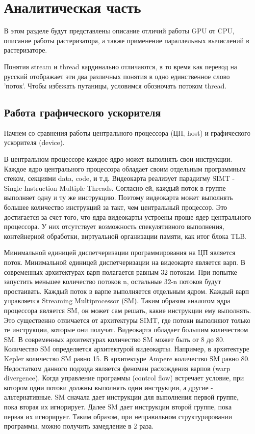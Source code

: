\chapter{Аналитическая часть}
В этом разделе будут представлены описание отличий работы GPU от CPU, описание работы растеризатора, а также применение параллельных вычислений в растеризаторе.

Понятия stream и thread кардинально отличаются, в то время как перевод на русский отображает эти два различных понятия в одно единственное слово 'поток'. Чтобы избежать путаницы, условимся обозночать потоком thread.

\section{Работа графического ускорителя}

Начнем со сравнения работы центрального процессора (ЦП, host) и графического ускорителя (device).

В центральном процессоре каждое ядро может выполнять свои инструкции. Каждое ядро центрального процессора обладает своим отдельным программным стеком, секциями data, code, и т.д. Видеокарта реализует парадигму SIMT - Single Instruction Multiple Threads. 
Согласно ей, каждый поток в группе выполняет одну и ту же инструкцию. Поэтому видеокарта может выполнять большее количество инструкций за такт, чем центральный процессор.
Это достигается за счет того, что ядра видеокарты устроены проще ядер центрального процессора. У них отсутствует возможность спекулятивного выполнения, контейнерной обработки, виртуальной организации памяти, как итог блока TLB.

Минимальной единицей диспетчеризации программирования на ЦП является поток. Минимальной единицей диспетчеризации на видеокарте является варп. В современных архитектурах варп полагается равным 32 потокам. При попытке запустить меньшее количество потоков n, остальные 32-n потоков будут простаивать.
Каждый поток в варпе выполняется отдельным ядром. Каждый варп управляется Streaming Multiprocessor (SM). Таким образом аналогом ядра процессора является SM, он может сам решать, какие инструкции ему выполнять. Это существенно отличается от архитектуры SIMT, где потоки выполняют только те инструкции, которые они получат. Видеокарта обладает большим количеством SM. В современных архитектурах количество SM может быть от 8 до 80. Количество SM определяется архитектурой видеокарты. Например, в архитектуре Kepler количество SM равно 15. В архитектуре Ampere количество SM равно 80.
Недостатком данного подхода является феномен расхождения варпов (warp divergence). Когда управление программы (control flow) встречает условие, при котором одни потоки должны выполнять одни инструкции, а другие - альтернативные. SM сначала дает инструкции для выполнения первой группе, пока вторая их игнорирует. Далее SM дает инструкции второй группе, пока первая их игнорирует. Таким образом, при неправильном структурировании программы, можно получить замедление в 2 раза.

